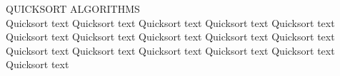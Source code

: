 {\sffamily\normalsize{\color{sciorange} QUICKSORT ALGORITHMS}}\vspace{1mm}\\
\footnotesize 
Quicksort text  
Quicksort text 
Quicksort text  
Quicksort text 
Quicksort text  
Quicksort text 
Quicksort text  
Quicksort text 
Quicksort text  
Quicksort text 
Quicksort text  
Quicksort text 
Quicksort text  
Quicksort text 
Quicksort text  
Quicksort text 